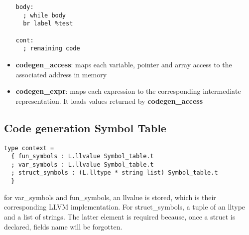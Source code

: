 \documentclass{article}
\begin{document}
\begin{itemize}
\begin{minipage}{0.45\textwidth}
\begin{verbatim}
body:
  ; while body
  br label %test

cont:
  ; remaining code

\end{verbatim}
\end{minipage}





  \item \textbf{codegen\_access}: maps each variable, pointer and array access to the associated address in memory
  \item \textbf{codegen\_expr}: maps each expression to the corresponding intermediate representation. It loads
  values returned by \textbf{codegen\_access}
\end{itemize}

\subsection*{Code generation Symbol Table}
\begin{lstlisting}
type context =
  { fun_symbols : L.llvalue Symbol_table.t
  ; var_symbols : L.llvalue Symbol_table.t
  ; struct_symbols : (L.lltype * string list) Symbol_table.t
  }
\end{lstlisting}
for var\_symbols and fun\_symbols, an llvalue is stored, which is their corresponding LLVM implementation.
For struct\_symbols, a tuple of an lltype and a list of strings. The latter element is required because, once a struct is declared,
fields name will be forgotten.
\end{document}
